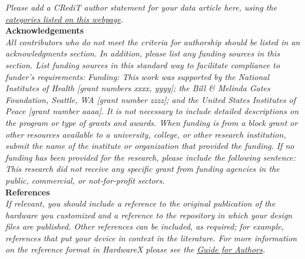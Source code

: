 \documentclass[11pt, letterpaper]{article}
\begin{document}
\noindent
{\it Please add a CRediT author statement for your data article here, using the \href{https://www.elsevier.com/authors/journal-authors/policies-and-ethics/credit-author-statement}{categories listed on this webpage}.}\\


\noindent
\textbf{Acknowledgements}\\
\noindent
\textit{All contributors who do not meet the criteria for authorship should be listed in an acknowledgments section.}
\vskip 0.2cm
\noindent
\textit{In addition, please list any funding sources in this section. List funding sources in this standard way to facilitate compliance to funder's requirements:}
\vskip 0.2cm
\noindent
\textit{Funding: This work was supported by the National Institutes of Health [grant numbers xxxx, yyyy]; the Bill \& Melinda Gates Foundation, Seattle, WA [grant number zzzz]; and the United States Institutes of Peace [grant number aaaa].}
\vskip 0.2cm
\noindent
\textit{It is not necessary to include detailed descriptions on the program or type of grants and awards. When funding is from a block grant or other resources available to a university, college, or other research institution, submit the name of the institute or organization that provided the funding.}
\vskip 0.2cm
\noindent
\textit{If no funding has been provided for the research, please include the following sentence:}
\vskip 0.2cm
\noindent
\textit{This research did not receive any specific grant from funding agencies in the public, commercial, or not-for-profit sectors.
}\\


\noindent
\textbf{References}\\
\noindent
\textit{If relevant, you should include a reference to the original publication of the hardware you customized and a reference to the repository in which your design files are published.  Other references can be included, as required; for example, references that put your device in context in the literature. For more information on the reference format in HardwareX please see the \href{https://www.elsevier.com/journals/hardwarex/2468-0672/guide-for-authors}{\underline{Guide for Authors}}.}
\end{document}
